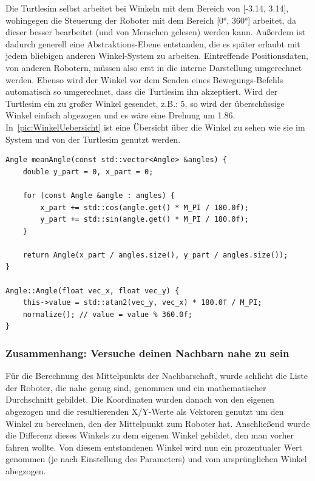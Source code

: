 Die Turtlesim selbst arbeitet bei Winkeln mit dem Bereich von [-3.14, 3.14], wohingegen die Steuerung der Roboter mit dem Bereich [0°, 360°] arbeitet, da dieser besser bearbeitet (und von Menschen gelesen) werden kann. Außerdem ist dadurch generell eine Abstraktions-Ebene entstanden, die es später erlaubt mit jedem bliebigen anderen Winkel-System zu arbeiten.
Eintreffende Positionsdaten, von anderen Robotern, müssen also erst in die interne Darstellung umgerechnet werden. Ebenso wird der Winkel vor dem Senden eines Bewegungs-Befehls automatisch so umgerechnet, dass die Turtlesim ihn akzeptiert. Wird der Turtlesim ein zu großer Winkel gesendet, z.B.: 5, so wird der überschüssige Winkel einfach abgezogen und es wäre eine Drehung um 1.86. In~\autoref{pic:WinkelUebersicht} ist eine Übersicht über die Winkel zu sehen wie sie im System und von der Turtlesim genutzt werden.

\begin{lstlisting}[style=cpp, title=Berechnung der mittleren Ausrichtung eines Schwarms]
Angle meanAngle(const std::vector<Angle> &angles) {
    double y_part = 0, x_part = 0;

    for (const Angle &angle : angles) {
        x_part += std::cos(angle.get() * M_PI / 180.0f);
        y_part += std::sin(angle.get() * M_PI / 180.0f);
    }

    return Angle(x_part / angles.size(), y_part / angles.size());
}

Angle::Angle(float vec_x, float vec_y) {
    this->value = std::atan2(vec_y, vec_x) * 180.0f / M_PI;
    normalize(); // value = value % 360.0f;
}
\end{lstlisting}

 
\subsubsection*{Zusammenhang: Versuche deinen Nachbarn nahe zu sein}

Für die Berechnung des Mittelpunkts der Nachbarschaft, wurde schlicht die Liste der Roboter, die nahe genug sind, genommen und ein mathematischer Durchschnitt gebildet. Die Koordinaten wurden danach von den eigenen abgezogen und die resultierenden X/Y-Werte als Vektoren genutzt um den Winkel zu berechnen, den der Mittelpunkt zum Roboter hat. Anschließend wurde die Differenz dieses Winkels zu dem eigenen Winkel gebildet, den man vorher fahren wollte.
Von diesem entstandenen Winkel wird nun ein prozentualer Wert genommen (je nach Einstellung des Parameters) und vom ursprünglichen Winkel abegzogen.

